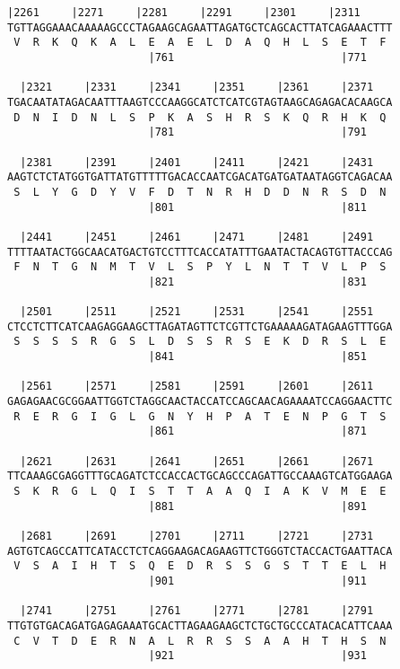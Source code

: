\documentclass{article}
\begin{document}
\begin{Verbatim}[fontfamily=courier]
  |2261     |2271     |2281     |2291     |2301     |2311   
TGTTAGGAAACAAAAAGCCCTAGAAGCAGAATTAGATGCTCAGCACTTATCAGAAACTTT
 V  R  K  Q  K  A  L  E  A  E  L  D  A  Q  H  L  S  E  T  F 
                      |761                          |771    

  |2321     |2331     |2341     |2351     |2361     |2371   
TGACAATATAGACAATTTAAGTCCCAAGGCATCTCATCGTAGTAAGCAGAGACACAAGCA
 D  N  I  D  N  L  S  P  K  A  S  H  R  S  K  Q  R  H  K  Q 
                      |781                          |791    

  |2381     |2391     |2401     |2411     |2421     |2431   
AAGTCTCTATGGTGATTATGTTTTTGACACCAATCGACATGATGATAATAGGTCAGACAA
 S  L  Y  G  D  Y  V  F  D  T  N  R  H  D  D  N  R  S  D  N 
                      |801                          |811    

  |2441     |2451     |2461     |2471     |2481     |2491   
TTTTAATACTGGCAACATGACTGTCCTTTCACCATATTTGAATACTACAGTGTTACCCAG
 F  N  T  G  N  M  T  V  L  S  P  Y  L  N  T  T  V  L  P  S 
                      |821                          |831    

  |2501     |2511     |2521     |2531     |2541     |2551   
CTCCTCTTCATCAAGAGGAAGCTTAGATAGTTCTCGTTCTGAAAAAGATAGAAGTTTGGA
 S  S  S  S  R  G  S  L  D  S  S  R  S  E  K  D  R  S  L  E 
                      |841                          |851    

  |2561     |2571     |2581     |2591     |2601     |2611   
GAGAGAACGCGGAATTGGTCTAGGCAACTACCATCCAGCAACAGAAAATCCAGGAACTTC
 R  E  R  G  I  G  L  G  N  Y  H  P  A  T  E  N  P  G  T  S 
                      |861                          |871    

  |2621     |2631     |2641     |2651     |2661     |2671   
TTCAAAGCGAGGTTTGCAGATCTCCACCACTGCAGCCCAGATTGCCAAAGTCATGGAAGA
 S  K  R  G  L  Q  I  S  T  T  A  A  Q  I  A  K  V  M  E  E 
                      |881                          |891    

  |2681     |2691     |2701     |2711     |2721     |2731   
AGTGTCAGCCATTCATACCTCTCAGGAAGACAGAAGTTCTGGGTCTACCACTGAATTACA
 V  S  A  I  H  T  S  Q  E  D  R  S  S  G  S  T  T  E  L  H 
                      |901                          |911    

  |2741     |2751     |2761     |2771     |2781     |2791   
TTGTGTGACAGATGAGAGAAATGCACTTAGAAGAAGCTCTGCTGCCCATACACATTCAAA
 C  V  T  D  E  R  N  A  L  R  R  S  S  A  A  H  T  H  S  N 
                      |921                          |931    

\end{Verbatim}
\end{document}
